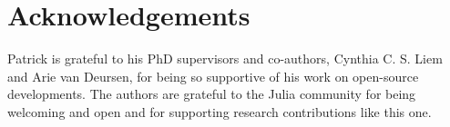 \documentclass{juliacon}
\begin{document}
\hypertarget{sec-ack}{%
\section{Acknowledgements}\label{sec-ack}}

Patrick is grateful to his PhD supervisors and co-authors, Cynthia C. S.
Liem and Arie van Deursen, for being so supportive of his work on
open-source developments. The authors are grateful to the Julia
community for being welcoming and open and for supporting research
contributions like this one.


\end{document}

